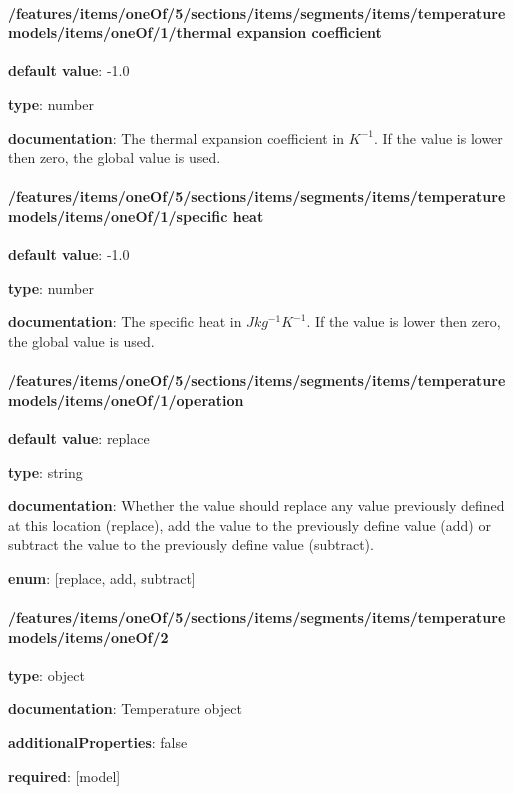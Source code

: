 \begin{itemized}
\end{itemized}\paragraph{/features/items/oneOf/5/sections/items/segments/items/temperature models/items/oneOf/1/thermal expansion coefficient} \begin{itemized}
\item {\bf default value}: -1.0
\item {\bf type}: number
\item {\bf documentation}: The thermal expansion coefficient in $K^{-1}$. If the value is lower then zero, the global value is used.
\end{itemized}\paragraph{/features/items/oneOf/5/sections/items/segments/items/temperature models/items/oneOf/1/specific heat} \begin{itemized}
\item {\bf default value}: -1.0
\item {\bf type}: number
\item {\bf documentation}: The specific heat in $J kg^{-1} K^{-1}$. If the value is lower then zero, the global value is used.
\end{itemized}\paragraph{/features/items/oneOf/5/sections/items/segments/items/temperature models/items/oneOf/1/operation} \begin{itemized}
\item {\bf default value}: replace
\item {\bf type}: string
\item {\bf documentation}: Whether the value should replace any value previously defined at this location (replace), add the value to the previously define value (add) or subtract the value to the previously define value (subtract).
\item {\bf enum}: [replace, add, subtract]\end{itemized}\paragraph{/features/items/oneOf/5/sections/items/segments/items/temperature models/items/oneOf/2} \begin{itemized}
\item {\bf type}: object
\item {\bf documentation}: Temperature object
\item {\bf additionalProperties}: false
\item {\bf required}: [model]\end{itemized}
